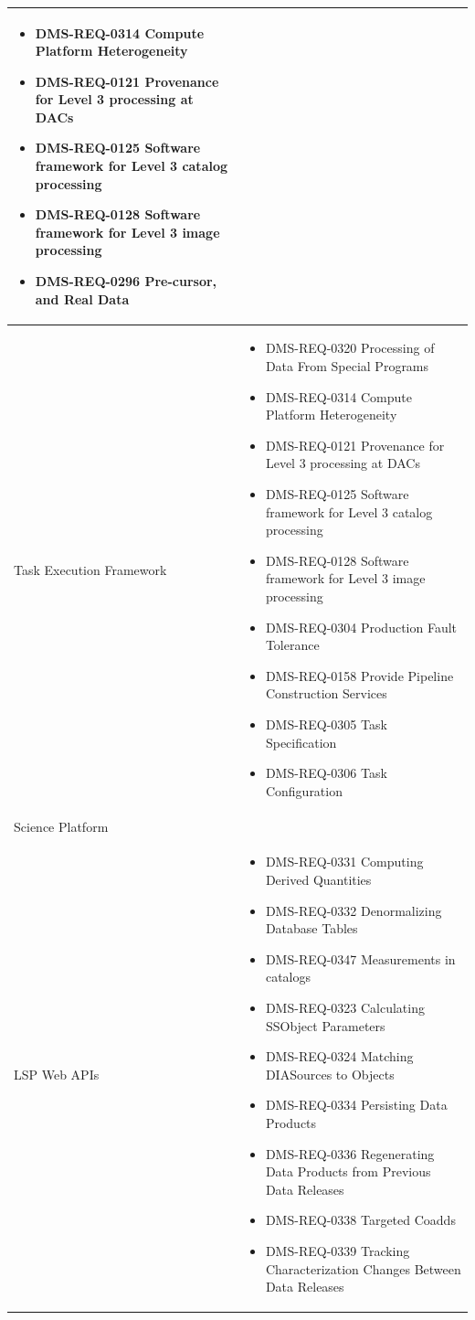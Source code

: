 \documentclass[DM,lsstdraft,toc]{lsstdoc}
\begin{document}
\begin{xtabular}{|p{0.1\textwidth}|p{0.85\textwidth}|}
\begin{itemize}
\item DMS-REQ-0314 Compute Platform Heterogeneity
\item DMS-REQ-0121 Provenance for Level 3 processing at DACs
\item DMS-REQ-0125 Software framework for Level 3 catalog processing
\item DMS-REQ-0128 Software framework for Level 3 image processing
\item DMS-REQ-0296 Pre-cursor, and Real Data \end{itemize} \\ \hline
Task Execution Framework &
\begin{itemize} \item DMS-REQ-0320 Processing of Data From Special Programs
\item DMS-REQ-0314 Compute Platform Heterogeneity
\item DMS-REQ-0121 Provenance for Level 3 processing at DACs
\item DMS-REQ-0125 Software framework for Level 3 catalog processing
\item DMS-REQ-0128 Software framework for Level 3 image processing
\item DMS-REQ-0304 Production Fault Tolerance
\item DMS-REQ-0158 Provide Pipeline Construction Services
\item DMS-REQ-0305 Task Specification
\item DMS-REQ-0306 Task Configuration \end{itemize} \\ \hline
Science Platform &
\\ \hline
LSP Web APIs &
\begin{itemize} \item DMS-REQ-0331 Computing Derived Quantities
\item DMS-REQ-0332 Denormalizing Database Tables
\item DMS-REQ-0347 Measurements in catalogs
\item DMS-REQ-0323 Calculating SSObject Parameters
\item DMS-REQ-0324 Matching DIASources to Objects
\item DMS-REQ-0334 Persisting Data Products
\item DMS-REQ-0336 Regenerating Data Products from Previous Data Releases
\item DMS-REQ-0338 Targeted Coadds
\item DMS-REQ-0339 Tracking Characterization Changes Between Data Releases

\end{itemize}
\end{xtabular}
\end{document}
